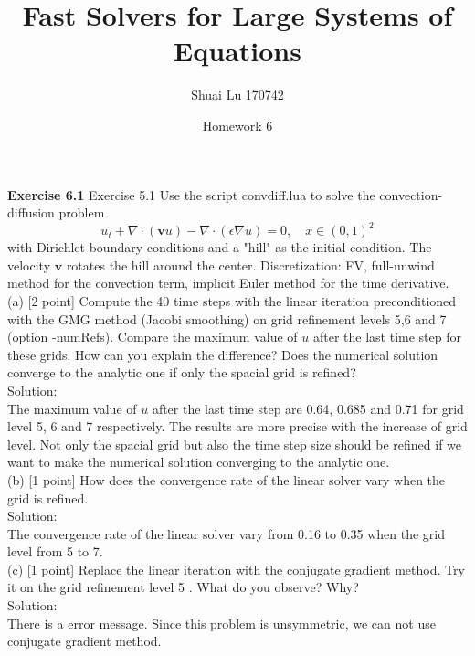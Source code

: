 \documentclass[a4paper]{article}
\title{Fast Solvers for Large Systems of Equations}
\author{Shuai Lu 170742}
\date{Homework 6}
\begin{document}
\maketitle
\noindent \textbf{Exercise 6.1} Exercise 5.1 Use the script convdiff.lua to solve the convection-diffusion problem
$$
u_{t}+\nabla \cdot(\mathbf{v} u)-\nabla \cdot(\epsilon \nabla u)=0, \quad x \in(0,1)^{2}
$$
with Dirichlet boundary conditions and a "hill" as the initial condition. The velocity $\mathbf{v}$ rotates the hill around the center. Discretization: FV, full-unwind method for the convection term, implicit Euler method for the time derivative.\\

\noindent (a) [2 point] Compute the 40 time steps with the linear iteration preconditioned with the GMG method (Jacobi smoothing) on grid refinement levels 5,6 and 7 (option -numRefs). Compare the maximum value of $u$ after the last time step for these grids. How can you explain the difference? Does the numerical solution converge to the analytic one if only the spacial grid is refined?\\

\noindent Solution:\\
\noindent The maximum value of $u$ after the last time step are 0.64, 0.685 and 0.71 for grid level 5, 6 and 7 respectively. The results are more precise with the increase of grid level. Not only the spacial grid but also the time step size should be refined if we want to make the numerical solution converging to the analytic one.\\

\noindent (b) [1 point] How does the convergence rate of the linear solver vary when the grid is refined.\\

\noindent Solution:\\
\noindent The convergence rate of the linear solver vary from 0.16 to 0.35 when the grid level from 5 to 7.\\

\noindent (c) [1 point] Replace the linear iteration with the conjugate gradient method. Try it on the grid refinement level 5 . What do you observe? Why?\\

\noindent Solution:\\
\noindent There is a error message. Since this problem is unsymmetric, we can not use conjugate gradient method.\\
\end{document}
